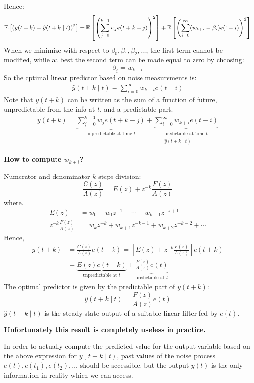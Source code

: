 Hence:
\begin{align*}
	\mathbb{E}\left[(y(t+k)-\hat{y}(t+k \mid t))^{2}\right]=\mathbb{E}\left[\left(\sum_{j=0}^{k-1} w_{j} e(t+k-j)\right)^{2}\right]+\mathbb{E}\left[\left(\sum_{i=0}^{\infty} (w_{k+i}-\beta_{i}) e(t-i)\right)^{2}\right]
\end{align*}
When we minimize with respect to $\beta_{0}, \beta_{1}, \beta_{2}, \ldots$, the first term cannot be modified, while at best the second term can be made equal to zero by choosing:
\[
	\beta_{i} = w_{k+i}
\]
So the optimal linear predictor based on noise measurements is:
\begin{align*}
	\boxed{\hat{y}(t+k \mid t) = \sum_{i=0}^{\infty}w_{k+i} e(t-i)}
\end{align*}
Note that $y(t+k)$ can be written as the sum of a function of future, unpredictable from the info at $t$, and a predictable part. 
\begin{align*}
	y(t+k)= \underbrace{\sum_{j=0}^{k-1} w_{j} e(t+k-j)}_{\text{unpredictable at time $t$}} + \underbrace{\sum_{i=0}^{\infty} w_{k+i} e(t-i)}_{\substack{\text{predictable at time $t$}\\\hat{y}(t+k \mid t)}}
\end{align*}

\textbf{How to compute $w_{k+i}$?}

Numerator and denominator $k$-steps division:
\[
	\boxed{\frac{C(z)}{A(z)}=E(z)+z^{-k} \frac{F(z)}{A(z)}}
\]
where,
\begin{align*}
	E(z)&=w_{0}+w_{1} z^{-1}+\cdots+w_{k-1} z^{-k+1} \\
	z^{-k} \frac{F(z)}{A(z)}&=w_{k} z^{-k}+w_{k+1} z^{-k-1}+w_{k+2} z^{-k-2}+\cdots
\end{align*}
Hence,
\begin{align*}
	y(t+k) &=\frac{C(z)}{A(z)} e(t+k)=\left[E(z)+z^{-k} \frac{F(z)}{A(z)}\right] e(t+k)\\
	&=\underbrace{E(z)e(t+k)}_{\text{unpredictable at }t}+\underbrace{\frac{F(z)}{A(z)}e(t)}_{\text{predictable at }t}
\end{align*}
The optimal predictor is given by the predictable part of $y(t + k)$:
\[
	\boxed{\hat{y}(t+k \mid t) = \frac{F(z)}{A(z)}e(t)}
\]
$\hat{y}(t+k \mid t)$ is the steady-state output of a suitable linear filter fed by $e(t)$.

\textbf{Unfortunately this result is completely useless in practice.}

In order to actually compute the predicted value for the output variable based on the above expression for $\hat{y}(t+k \mid t)$, past values of the noise process $e(t),e(t_1),e(t_2),\ldots$ should be accessible, but the output $y(t)$ is the only information in reality which we can access.

